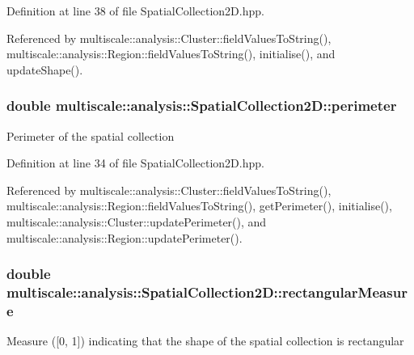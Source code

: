 Definition at line 38 of file Spatial\-Collection2\-D.\-hpp.



Referenced by multiscale\-::analysis\-::\-Cluster\-::field\-Values\-To\-String(), multiscale\-::analysis\-::\-Region\-::field\-Values\-To\-String(), initialise(), and update\-Shape().

\hypertarget{classmultiscale_1_1analysis_1_1SpatialCollection2D_ae8045702b66fd813cfff49fa86b02e68}{
\subsubsection[{perimeter}]{\setlength{\rightskip}{0pt plus 5cm}double multiscale\-::analysis\-::\-Spatial\-Collection2\-D\-::perimeter\hspace{0.3cm}{\ttfamily [protected]}}}\label{classmultiscale_1_1analysis_1_1SpatialCollection2D_ae8045702b66fd813cfff49fa86b02e68}
Perimeter of the spatial collection 

Definition at line 34 of file Spatial\-Collection2\-D.\-hpp.



Referenced by multiscale\-::analysis\-::\-Cluster\-::field\-Values\-To\-String(), multiscale\-::analysis\-::\-Region\-::field\-Values\-To\-String(), get\-Perimeter(), initialise(), multiscale\-::analysis\-::\-Cluster\-::update\-Perimeter(), and multiscale\-::analysis\-::\-Region\-::update\-Perimeter().

\hypertarget{classmultiscale_1_1analysis_1_1SpatialCollection2D_aad7d79a7bd299d4d3c08a864cfcb77c3}{
\subsubsection[{rectangular\-Measure}]{\setlength{\rightskip}{0pt plus 5cm}double multiscale\-::analysis\-::\-Spatial\-Collection2\-D\-::rectangular\-Measure\hspace{0.3cm}{\ttfamily [protected]}}}\label{classmultiscale_1_1analysis_1_1SpatialCollection2D_aad7d79a7bd299d4d3c08a864cfcb77c3}
Measure (\mbox{[}0, 1\mbox{]}) indicating that the shape of the spatial collection is rectangular 


